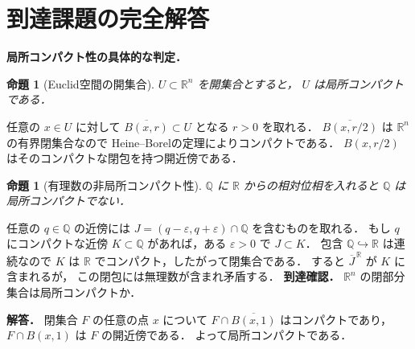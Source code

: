 \documentclass[a5paper,10pt,onecolumn]{jsarticle}
\makeatletter
\theoremstyle{mathnotetheorem}
\newtheorem{proposition}[theorem]{命題}
\renewcommand{\proofname}{証明}
\renewenvironment{proof}[1][\proofname]{%
  \par\pushQED{\qed}\normalfont\topsep4\p@\@plus2\p@\relax
  \trivlist\item[\hskip\labelsep\bfseries #1]\ignorespaces
}{\popQED\endtrivlist\@endpefalse}
\makeatother
\begin{document}
\section{到達課題の完全解答}
\noindent\textbf{局所コンパクト性の具体的な判定．}
\begin{proposition}[Euclid空間の開集合]
$U\subset\mathbb R^n$ を開集合とすると，
$U$ は局所コンパクトである．
\end{proposition}
\begin{proof}
任意の $x\in U$ に対して
$\overline{B(x,r)}\subset U$ となる $r>0$ を取れる．
$\overline{B(x,r/2)}$ は $\mathbb R^n$ の有界閉集合なので
Heine--Borelの定理によりコンパクトである．
$B(x,r/2)$ はそのコンパクトな閉包を持つ開近傍である．
\end{proof}
\begin{proposition}[有理数の非局所コンパクト性]
$\mathbb Q$ に $\mathbb R$ からの相対位相を入れると
$\mathbb Q$ は局所コンパクトでない．
\end{proposition}
\begin{proof}
任意の $q\in\mathbb Q$ の近傍には
$J=(q-\varepsilon,q+\varepsilon)\cap\mathbb Q$
を含むものを取れる．
もし $q$ にコンパクトな近傍 $K\subset\mathbb Q$
があれば，ある $\varepsilon>0$ で $J\subset K$．
包含 $\mathbb Q\hookrightarrow\mathbb R$ は連続なので
$K$ は $\mathbb R$ でコンパクト，したがって閉集合である．
すると $\overline J^{\,\mathbb R}$ が $K$ に含まれるが，
この閉包には無理数が含まれ矛盾する．
\end{proof}
\noindent\textbf{到達確認．}
$\mathbb R^n$ の閉部分集合は局所コンパクトか．
\par\noindent\textbf{解答．}
閉集合 $F$ の任意の点 $x$ について
$F\cap\overline{B(x,1)}$ はコンパクトであり，
$F\cap B(x,1)$ は $F$ の開近傍である．
よって局所コンパクトである．
\end{document}
